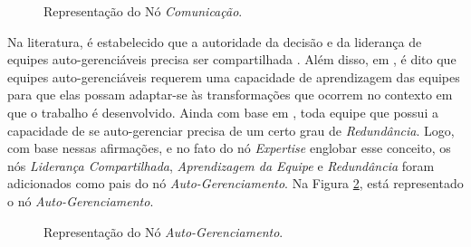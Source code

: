 \begin{figure}[ht!]
\begin{center}
	\end{center}
	\caption{Representação do Nó \textit{Comunicação}.}
	\label{modelo:gad:comunicacao}
\end{figure}

Na literatura, é estabelecido que a autoridade da decisão e da liderança de equipes auto-gerenciáveis precisa ser compartilhada \cite{morgan} \cite{kirkman}. Além disso, em \cite{morgan}, é dito que equipes auto-gerenciáveis requerem uma capacidade de aprendizagem das equipes para que elas possam adaptar-se às transformações que ocorrem no contexto em que o trabalho é desenvolvido. Ainda com base em \cite{morgan}, toda equipe que possui a capacidade de se auto-gerenciar precisa de um certo grau de \textit{Redundância}. Logo, com base nessas afirmações, e no fato do nó \textit{Expertise} englobar esse conceito, os nós \textit{Liderança Compartilhada}, \textit{Aprendizagem da Equipe} e \textit{Redundância} foram adicionados como pais do nó \textit{Auto-Gerenciamento}. Na Figura \ref{modelo:gad:autogerenciamento}, está representado o nó \textit{Auto-Gerenciamento}.

\begin{figure}[ht!]
\begin{center}
	\end{center}
	\caption{Representação do Nó \textit{Auto-Gerenciamento}.}
	\label{modelo:gad:autogerenciamento}
\end{figure}

